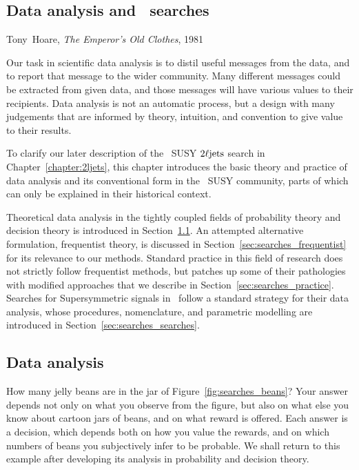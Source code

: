 \begin{singlespacing}
\chapter{Data analysis and \atlas\ searches}
\label{chapter:searches}
\begin{epigraphs}
%
{Tony~Hoare,
\textit{The Emperor’s Old Clothes},
1981~\cite{hoare2007emperor}}
\end{epigraphs}
\end{singlespacing}

Our task in scientific data analysis is to distil useful messages from the
data, and to report that message to the wider community.
Many different messages could be extracted from given data,
and those messages will have various values to their recipients.
Data analysis is not an automatic process, but a design with many judgements
that are informed by theory, intuition, and convention to give value to their
results.

To clarify our later description of the \atlas\ SUSY $2\ell\mathrm{jets}$ search in
Chapter~\ref{chapter:2ljets}, this chapter introduces the basic theory and
practice of data analysis and its conventional form in the \atlas\ SUSY
community, parts of which can only be explained in their historical context.

Theoretical data analysis in the tightly coupled fields of probability theory
and decision theory is introduced in Section~\ref{sec:searches_data_analysis}.
An attempted alternative formulation, frequentist theory, is discussed in
Section~\ref{sec:searches_frequentist} for its relevance to our methods.
Standard practice in this field of research does not strictly follow
frequentist methods, but patches up some of their pathologies with modified
approaches that we describe in Section~\ref{sec:searches_practice}.
Searches for Supersymmetric signals in \atlas\ follow a standard strategy for
their data analysis, whose procedures, nomenclature, and parametric modelling
are introduced in Section~\ref{sec:searches_searches}.


\section{Data analysis}
\label{sec:searches_data_analysis}
How many jelly beans are in the jar of Figure~\ref{fig:searches_beans}?
Your answer depends not only on what you observe from the figure, but also on
what else you know about cartoon jars of beans, and on what reward is offered.
Each answer is a decision, which depends both on how you value the rewards,
and on which numbers of beans you subjectively infer to be probable.
We shall return to this example after developing its analysis in probability
and decision theory.

